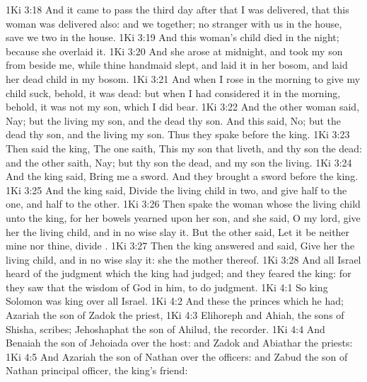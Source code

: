 \vs 1Ki 3:18 And it came to pass the third day after that I was delivered, that this woman was delivered also: and we  together;  no stranger with us in the house, save we two in the house.
\vs 1Ki 3:19 And this woman's child died in the night; because she overlaid it.
\vs 1Ki 3:20 And she arose at midnight, and took my son from beside me, while thine handmaid slept, and laid it in her bosom, and laid her dead child in my bosom.
\vs 1Ki 3:21 And when I rose in the morning to give my child suck, behold, it was dead: but when I had considered it in the morning, behold, it was not my son, which I did bear.
\vs 1Ki 3:22 And the other woman said, Nay; but the living  my son, and the dead  thy son. And this said, No; but the dead  thy son, and the living  my son. Thus they spake before the king.
\vs 1Ki 3:23 Then said the king, The one saith, This  my son that liveth, and thy son  the dead: and the other saith, Nay; but thy son  the dead, and my son  the living.
\vs 1Ki 3:24 And the king said, Bring me a sword. And they brought a sword before the king.
\vs 1Ki 3:25 And the king said, Divide the living child in two, and give half to the one, and half to the other.
\vs 1Ki 3:26 Then spake the woman whose the living child  unto the king, for her bowels yearned upon her son, and she said, O my lord, give her the living child, and in no wise slay it. But the other said, Let it be neither mine nor thine,  divide .
\vs 1Ki 3:27 Then the king answered and said, Give her the living child, and in no wise slay it: she  the mother thereof.
\vs 1Ki 3:28 And all Israel heard of the judgment which the king had judged; and they feared the king: for they saw that the wisdom of God  in him, to do judgment.
\vs 1Ki 4:1 So king Solomon was king over all Israel.
\vs 1Ki 4:2 And these  the princes which he had; Azariah the son of Zadok the priest,
\vs 1Ki 4:3 Elihoreph and Ahiah, the sons of Shisha, scribes; Jehoshaphat the son of Ahilud, the recorder.
\vs 1Ki 4:4 And Benaiah the son of Jehoiada  over the host: and Zadok and Abiathar  the priests:
\vs 1Ki 4:5 And Azariah the son of Nathan  over the officers: and Zabud the son of Nathan  principal officer,  the king's friend:
